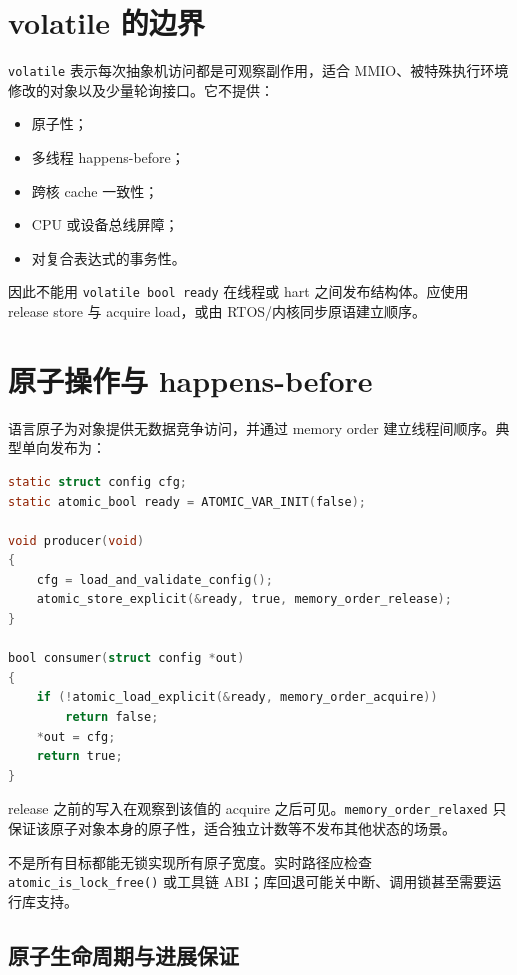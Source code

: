 \section{volatile 的边界}

\texttt{volatile} 表示每次抽象机访问都是可观察副作用，适合 MMIO、被特殊执行环境修改的对象以及少量轮询接口。它不提供：
\begin{itemize}
  \item 原子性；
  \item 多线程 happens-before；
  \item 跨核 cache 一致性；
  \item CPU 或设备总线屏障；
  \item 对复合表达式的事务性。
\end{itemize}

因此不能用 \texttt{volatile bool ready} 在线程或 hart 之间发布结构体。应使用 release store 与 acquire load，或由 RTOS/内核同步原语建立顺序。

\section{原子操作与 happens-before}

语言原子为对象提供无数据竞争访问，并通过 memory order 建立线程间顺序。典型单向发布为：
\begin{lstlisting}[language=C,caption={release/acquire 发布不可变配置}]
static struct config cfg;
static atomic_bool ready = ATOMIC_VAR_INIT(false);

void producer(void)
{
    cfg = load_and_validate_config();
    atomic_store_explicit(&ready, true, memory_order_release);
}

bool consumer(struct config *out)
{
    if (!atomic_load_explicit(&ready, memory_order_acquire))
        return false;
    *out = cfg;
    return true;
}
\end{lstlisting}

release 之前的写入在观察到该值的 acquire 之后可见。\texttt{memory\_order\_relaxed} 只保证该原子对象本身的原子性，适合独立计数等不发布其他状态的场景。

不是所有目标都能无锁实现所有原子宽度。实时路径应检查 \texttt{atomic\_is\_lock\_free()} 或工具链 ABI；库回退可能关中断、调用锁甚至需要运行库支持。

\subsection{原子生命周期与进展保证}

